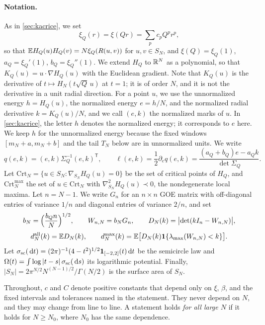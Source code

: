 \paragraph{Notation.}
As in \cref{sec:kacrice}, we set
\begin{equation}\label{eq:mo-zeta}
\xi_Q(r)=\xi(Qr)=\sum_{p}c_pQ^pr^p,
\end{equation}
so that $\mathbb E H_Q(u)H_Q(v)=N\xi_Q(R(u,v))$ for $u,v\in S_N$, and $\xi(Q)=\xi_Q(1)$, $a_Q=\xi_Q'(1)$, $b_Q=\xi_Q''(1)$. We extend $H_Q$ to $\mathbb R^N$ as a polynomial, so that $K_Q(u)=u\cdot\nabla H_Q(u)$ with the Euclidean gradient. Note that $K_Q(u)$ is the derivative of $t\mapsto H_N(t\sqrt Q\,u)$ at $t=1$; it is of order $N$, and it is not the derivative in a unit radial direction. For a point $u$, we use the unnormalized energy $h=H_Q(u)$, the normalized energy $e=h/N$, and the normalized radial derivative $k=K_Q(u)/N$, and we call $(e,k)$ the normalized marks of $u$. In \cref{sec:kacrice}, the letter $h$ denotes the normalized energy; it corresponds to $e$ here. We keep $h$ for the unnormalized energy because the fixed windows $[m_N+a,m_N+b]$ and the tail $T_N$ below are in unnormalized units. We write
\begin{equation}\label{eq:mo-qell}
q(e,k)=(e,k)\Sigma_Q^{-1}(e,k)^{\mathsf T},\qquad
\ell(e,k)=\frac12\partial_eq(e,k)=\frac{(a_Q+b_Q)e-a_Qk}{\det\Sigma_Q}.
\end{equation}
Let $\mathrm{Crt}_N=\{u\in S_N:\nabla_{S_N}H_Q(u)=0\}$ be the set of critical points of $H_Q$, and $\mathrm{Crt}_N^{\max}$ the set of $u\in\mathrm{Crt}_N$ with $\nabla_{S_N}^2H_Q(u)\prec0$, the nondegenerate local maxima. Let $n=N-1$. We write $G_n$ for an $n\times n$ GOE matrix with off-diagonal entries of variance $1/n$ and diagonal entries of variance $2/n$, and set
\begin{equation}\label{eq:mo-DN}
b_N=\Bigl(\frac{b_Qn}{N}\Bigr)^{1/2},\qquad W_{n,N}=b_NG_n,\qquad D_N(k)=\bigl|\det(kI_n-W_{n,N})\bigr|,
\end{equation}
\begin{equation}\label{eq:mo-dN}
d_N^{\rm all}(k)=\mathbb E D_N(k),\qquad d_N^{\max}(k)=\mathbb E\bigl[D_N(k)\mathbf 1\{\lambda_{\max}(W_{n,N})<k\}\bigr].
\end{equation}
Let $\sigma_{\rm sc}(\,\mathrm d t)=(2\pi)^{-1}(4-t^2)^{1/2}\mathbf 1_{[-2,2]}(t)\,\mathrm d t$ be the semicircle law and $\Omega(t)=\int\log|t-s|\,\sigma_{\rm sc}(\,\mathrm d s)$ its logarithmic potential. Finally, $|S_N|=2\pi^{N/2}N^{(N-1)/2}/\Gamma(N/2)$ is the surface area of $S_N$.

Throughout, $c$ and $C$ denote positive constants that depend only on $\xi$, $\beta$, and the fixed intervals and tolerances named in the statement. They never depend on $N$, and they may change from line to line. A statement holds \emph{for all large $N$} if it holds for $N\ge N_0$, where $N_0$ has the same dependence.


